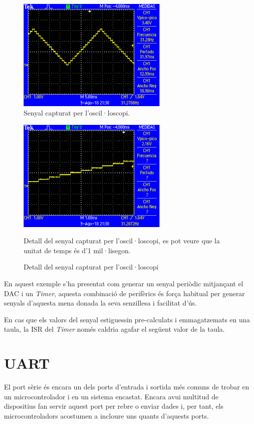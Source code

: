 \begin{figure}
 \centering
 \includegraphics[width=0.65\textwidth, keepaspectratio]{imatges/DAC_result_osc}
 \caption{Senyal capturat per l'oscil·loscopi.}
 \label{fig:DAC_result}
\end{figure}

\begin{figure}
 \centering
 \includegraphics[width=0.65\textwidth, keepaspectratio]{imatges/DAC_result_osc_zoom}
 \caption{Detall del senyal capturat per l'oscil·loscopi}{Detall del senyal capturat per l'oscil·loscopi, es pot veure que la unitat de temps és d'1 mil·lisegon.}
 \label{fig:DAC_result_zoom}
\end{figure}

En aquest exemple s'ha presentat com generar un senyal periòdic mitjançant el \gls{DAC} i un {\em Timer}, aquesta combinació de perifèrics és força habitual per generar senyals d'aquesta mena donada la seva senzillesa i facilitat d'ús.

En cas que els valors del senyal estiguessin pre-calculats i emmagatzemats en una taula, la \gls{ISR} del {\em Timer} només caldria agafar el següent valor de la taula.

\chapter{UART}
\label{sub:UART}
El port sèrie és encara un dels ports d'entrada i sortida més comuns de trobar en un microcontrolador i en un sistema encastat. Encara avui multitud de dispositius fan servir aquest port per rebre o enviar dades i, per tant, els microcontroladors acostumen a incloure uns quants d'aquests ports.

